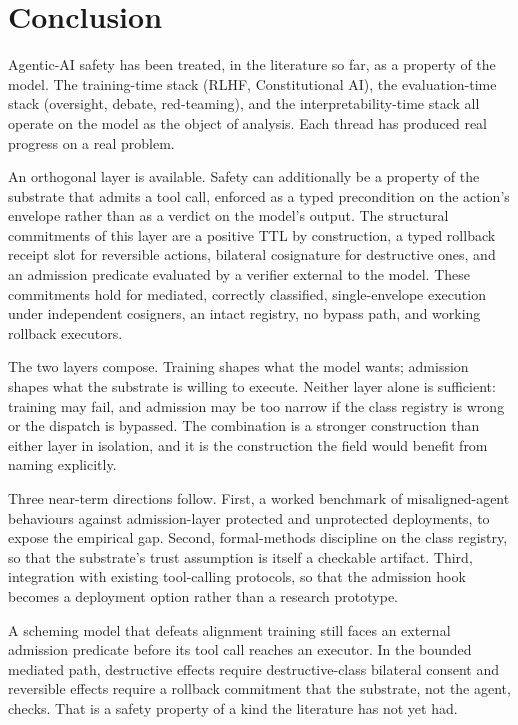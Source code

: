 \section{Conclusion}
\label{sec:conclusion}

Agentic-AI safety has been treated, in the literature so far, as a property of the model. The training-time stack (RLHF, Constitutional AI), the evaluation-time stack (oversight, debate, red-teaming), and the interpretability-time stack all operate on the model as the object of analysis. Each thread has produced real progress on a real problem.

An orthogonal layer is available. Safety can additionally be a property of the substrate that admits a tool call, enforced as a typed precondition on the action's envelope rather than as a verdict on the model's output. The structural commitments of this layer are a positive TTL by construction, a typed rollback receipt slot for reversible actions, bilateral cosignature for destructive ones, and an admission predicate evaluated by a verifier external to the model. These commitments hold for mediated, correctly classified, single-envelope execution under independent cosigners, an intact registry, no bypass path, and working rollback executors.

The two layers compose. Training shapes what the model wants; admission shapes what the substrate is willing to execute. Neither layer alone is sufficient: training may fail, and admission may be too narrow if the class registry is wrong or the dispatch is bypassed. The combination is a stronger construction than either layer in isolation, and it is the construction the field would benefit from naming explicitly.

Three near-term directions follow. First, a worked benchmark of misaligned-agent behaviours against admission-layer protected and unprotected deployments, to expose the empirical gap. Second, formal-methods discipline on the class registry, so that the substrate's trust assumption is itself a checkable artifact. Third, integration with existing tool-calling protocols, so that the admission hook becomes a deployment option rather than a research prototype.

A scheming model that defeats alignment training still faces an external admission predicate before its tool call reaches an executor. In the bounded mediated path, destructive effects require destructive-class bilateral consent and reversible effects require a rollback commitment that the substrate, not the agent, checks. That is a safety property of a kind the literature has not yet had.
